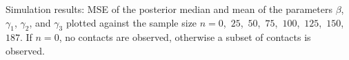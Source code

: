 Simulation results: MSE of the posterior median and mean of the parameters $\beta$, $\gamma_1$, $\gamma_2$, and $\gamma_3$ plotted against the sample size $n = 0$,\, $25$,\, $50$,\, $75$,\, $100$,\, $125$,\, $150$,\, $187$.\break
If $n=0$,
no contacts are observed,
otherwise a subset of contacts is observed.
